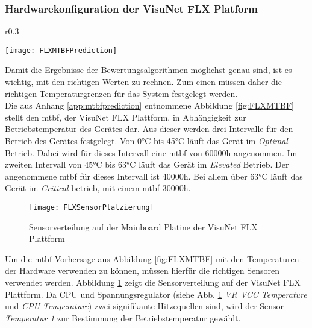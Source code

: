 \subsubsection*{Hardwarekonfiguration der VisuNet FLX Platform}\label{sec:FLXHardwarekonfiguration}
\begin{wrapfigure}{r}{0.3\textwidth}
    \vspace{-1.2cm}
    \captionsetup{justification=centering,format=plain, font=small}
    \begin{center}
        \texttt{[image: FLXMTBFPrediction]}
    \end{center}
    \vspace{-0.5cm}
    \caption{\ac{mtbf} Vorhersage für die VisuNet FLX Plattform}
    \label{fig:FLXMTBF}
    \vspace{-0.5cm}
\end{wrapfigure}
Damit die Ergebnisse der Bewertungsalgorithmen möglichst genau sind, ist es wichtig, mit den richtigen Werten zu rechnen. Zum einen müssen daher die richtigen Temperaturgrenzen für das System festgelegt werden.\\
Die aus Anhang \ref{app:mtbfprediction} entnommene Abbildung \ref{fig:FLXMTBF} stellt den \ac{mtbf}, der VisuNet FLX Plattform, in Abhängigkeit zur Betriebstemperatur des Gerätes dar. Aus dieser werden drei Intervalle für den Betrieb des Gerätes festgelegt. Von 0°C bis 45°C läuft das Gerät im \textit{Optimal} Betrieb. Dabei wird für dieses Intervall eine \ac{mtbf} von 60000h angenommen. Im zweiten Intervall von 45°C bis 63°C läuft das Gerät im \textit{Elevated} Betrieb. Der angenommene \ac{mtbf} für dieses Intervall ist 40000h. Bei allem über 63°C läuft das Gerät im \textit{Critical} betrieb, mit einem \ac{mtbf} 30000h.\\
\vspace{-1cm}
\begin{center}
    \begin{figure}[h!]
        \centering
        \texttt{[image: FLXSensorPlatzierung]}
        \caption{Sensorverteilung auf der Mainboard Platine der VisuNet FLX Plattform}
        \label{fig:FLXSensoren}
    \end{figure}
\end{center}
\vspace{-2.5cm}
Um die \ac{mtbf} Vorhersage aus Abbildung \ref{fig:FLXMTBF} mit den Temperaturen der Hardware verwenden zu können, müssen hierfür die richtigen Sensoren verwendet werden. Abbildung \ref{fig:FLXSensoren} zeigt die Sensorverteilung auf der VisuNet FLX Plattform. Da CPU und Spannungsregulator (siehe Abb. \ref{fig:FLXSensoren} \textit{VR VCC Temperature} und \textit{CPU Temperature}) zwei signifikante Hitzequellen sind, wird der Sensor \textit{Temperatur 1} zur Bestimmung der Betriebstemperatur gewählt. 
\vspace{-0.5cm}
